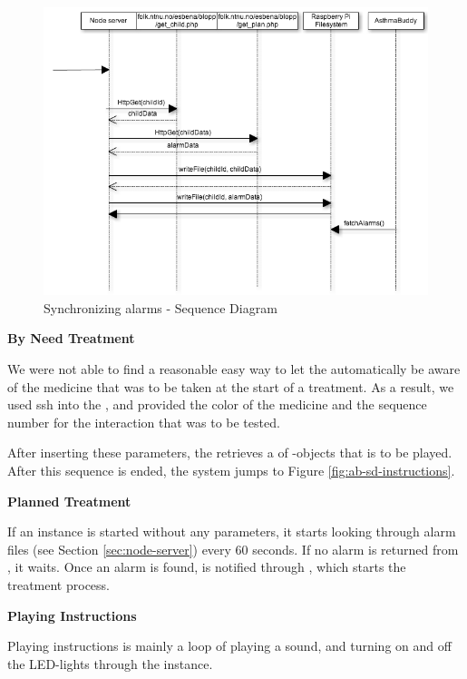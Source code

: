 \begin{figure}
	\centering
		\includegraphics[scale=0.6]{Pictures/sd/sd-synchronizingv2.png}
	\caption{Synchronizing alarms - Sequence Diagram}
	\label{fig:ab-sd-synchronizing}
\end{figure}

\textbf{By Need Treatment}

We were not able to find a reasonable easy way to let the \buddy{} automatically be aware of the medicine that was to be taken at the start of a treatment. As a result, we used ssh into the \rpi{}, and provided the color of the medicine and the sequence number for the interaction that was to be tested.

After inserting these parameters, the  retrieves a  of -objects that is to be played. After this sequence is ended, the system jumps to Figure \ref{fig:ab-sd-instructions}.
 
\textbf{Planned Treatment}

If an  instance is started without any parameters, it starts looking through alarm files (see Section \ref{sec:node-server}) every 60 seconds. If no alarm is returned from , it waits. Once an alarm is found,  is notified through , which starts the treatment process. 
 
\textbf{Playing Instructions}

Playing instructions is mainly a loop of playing a sound, and turning on and off the LED-lights through the  instance. 

